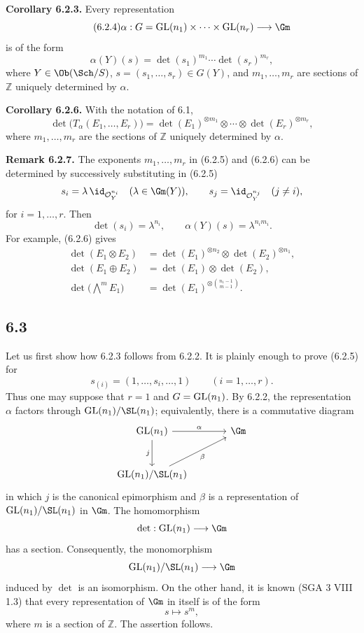 \textbf{Corollary 6.2.3.}
Every representation
\begin{equation}\tag{6.2.4}
\alpha:G=\GL(n_1)\times\cdots\times\GL(n_r)\longrightarrow\Gm
\end{equation}
is of the form
\begin{equation}\tag{6.2.5}
\alpha(Y)(s)=\det(s_1)^{m_1}\cdots\det(s_r)^{m_r},
\end{equation}
where $Y\in\Ob(\Sch/S)$, $s=(s_1,\ldots,s_r)\in G(Y)$, and
$m_1,\ldots,m_r$ are sections of $\mathbb Z$ uniquely determined by
$\alpha$.

\textbf{Corollary 6.2.6.}
With the notation of 6.1,
\begin{equation}\tag{6.2.6}
\det\bigl(T_\alpha(E_1,\ldots,E_r)\bigr)
=\det(E_1)^{\otimes m_1}\otimes\cdots\otimes
\det(E_r)^{\otimes m_r},
\end{equation}
where $m_1,\ldots,m_r$ are the sections of $\mathbb Z$ uniquely determined
by $\alpha$.

\textbf{Remark 6.2.7.}
The exponents $m_1,\ldots,m_r$ in (6.2.5) and (6.2.6) can be determined by
successively substituting in (6.2.5)
\[
s_i=\lambda\,\id_{\mathcal O_Y^{n_i}}\quad(\lambda\in\Gm(Y)),
\qquad
s_j=\id_{\mathcal O_Y^{n_j}}\quad(j\ne i),
\]
for $i=1,\ldots,r$. Then
\[
\det(s_i)=\lambda^{n_i},
\qquad
\alpha(Y)(s)=\lambda^{n_i m_i}.
\]
For example, (6.2.6) gives
\begin{align}
\det(E_1\otimes E_2)
&=\det(E_1)^{\otimes n_2}\otimes\det(E_2)^{\otimes n_1},
\tag{6.2.8}\\
\det(E_1\oplus E_2)
&=\det(E_1)\otimes\det(E_2),
\tag{6.2.9}\\
\det\bigl(\bigwedge\nolimits^m E_1\bigr)
&=\det(E_1)^{\otimes\binom{n_1-1}{m-1}}.
\tag{6.2.10}
\end{align}

\subsection*{6.3}
Let us first show how 6.2.3 follows from 6.2.2. It is plainly enough to prove
(6.2.5) for
\[
s_{(i)}=(1,\ldots,s_i,\ldots,1)\qquad(i=1,\ldots,r).
\]
Thus one may suppose that $r=1$ and $G=\operatorname{GL}(n_1)$. By 6.2.2, the
representation $\alpha$ factors through $\GL(n_1)/\SL(n_1)$; equivalently,
there is a commutative diagram
\[
\begin{tikzcd}[column sep=large,row sep=large]
\GL(n_1) \arrow[r,"\alpha"] \arrow[d,"j"'] & \Gm\\
\GL(n_1)/\SL(n_1) \arrow[ur,"\beta"'] &
\end{tikzcd}
\]
in which $j$ is the canonical epimorphism and $\beta$ is a representation
of $\GL(n_1)/\SL(n_1)$ in $\Gm$. The homomorphism
\[
\det:\GL(n_1)\longrightarrow\Gm
\]
has a section. Consequently, the monomorphism
\[
\GL(n_1)/\SL(n_1)\longrightarrow\Gm
\]
induced by $\det$ is an isomorphism. On the other hand, it is known
(SGA 3 VIII 1.3) that every representation of $\Gm$ in itself is of the
form
\[
s\longmapsto s^m,
\]
where $m$ is a section of $\mathbb Z$. The assertion follows.

